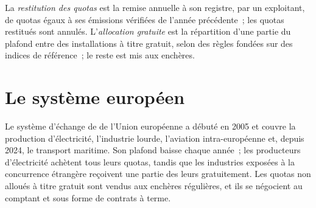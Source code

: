 \begin{definition}\label{def:m3:emissions-and-environmental-markets:surrender}
La \emph{restitution des quotas} est la remise annuelle
à son registre, par un exploitant, de quotas égaux à ses émissions vérifiées de l'année précédente~;
les quotas restitués sont annulés. L'\emph{allocation gratuite} est la
répartition d'une partie du plafond entre des installations à titre gratuit, selon des règles fondées sur des
indices de référence~; le reste est mis aux enchères.
\end{definition}

\begin{omfigure}
\centering
{}

\label{fig:m3:emissions-and-environmental-markets:cycle}
\end{omfigure}

\section{Le système européen}

Le système d'échange de  de l'Union européenne a débuté en 2005 et couvre la production d'électricité,
l'industrie lourde, l'aviation intra-européenne et, depuis 2024, le transport maritime. Son plafond baisse chaque année~;
les producteurs d'électricité achètent tous leurs quotas, tandis que les industries exposées à la concurrence
étrangère reçoivent une partie des leurs gratuitement. Les quotas non alloués à titre gratuit sont vendus aux enchères régulières, et ils se négocient au comptant et sous forme de contrats
à terme.

